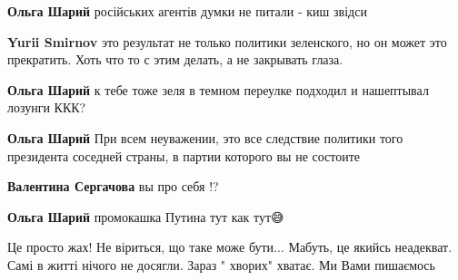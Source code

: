 \begin{itemize}
\begin{itemize}
\textbf{Ольга Шарий} російських агентів думки не питали - киш звідси

 
\textbf{Yurii Smirnov} это результат не только политики зеленского, но он может это прекратить. Хоть что то с этим делать, а не закрывать глаза.

 
\textbf{Ольга Шарий} к тебе тоже зеля в темном переулке подходил и нашептывал лозунги ККК?

 
\textbf{Ольга Шарий} При всем неуважении, это все следствие политики того президента соседней страны, в партии которого вы не состоите

 
\textbf{Валентина Сергачова} вы про себя !?

 
\textbf{Ольга Шарий} промокашка Путина тут как тут😅

 
Це просто жах! Не віриться, що таке може бути... Мабуть, це якийсь неадекват. Самі в житті нічого не досягли. Зараз " хворих" хватає. Ми Вами пишаємось


\end{itemize}
\end{itemize}
